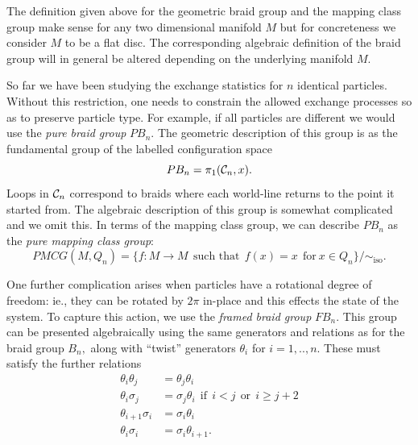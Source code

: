 
The definition given above for the geometric braid group
and the mapping class group make sense for any two dimensional
manifold $M$ but for concreteness we consider $M$ to be
a flat disc. 
The corresponding algebraic definition of the braid group
will in general be altered depending on the underlying manifold
$M.$

So far we have been studying the exchange statistics
for $n$ identical particles. Without this restriction, one needs to
constrain the allowed exchange processes so as to preserve particle type.
For example, if all particles are different we would use the
\emph{pure braid group} $PB_n.$
The geometric description of
this group is as the fundamental group of the labelled
configuration space
$$
    PB_n = \pi_1 ( \mathcal{C}_n, x ).
$$
Loops in $\mathcal{C}_n$ correspond to braids where each world-line returns
to the point it started from.
The algebraic description of this group is somewhat complicated and
we omit this.
In terms of the mapping class group, we can describe $PB_n$
as the \emph{pure mapping class group}:
$$
    PMCG(M, Q_n) = \{ f : M \to M \ \ \mbox{such that}\ \ f(x)=x \ \ \mbox{for}\ x\in Q_n\} / \sim_{\mbox{iso}}.
$$

One further complication arises when particles have a rotational
degree of freedom: ie., they can be rotated by $2\pi$ in-place and
this effects the state of the system.
To capture this action, we use the \emph{framed braid group} $FB_n.$
This group can be presented algebraically using the same generators
and relations as for the braid group $B_n,$ along with
``twist'' generators $\theta_i$ for $i=1,..,n.$
These must satisfy the further relations
\begin{align*}
    \theta_i \theta_j &= \theta_j \theta_i \\
    \theta_i\sigma_j &= \sigma_j\theta_i 
    \ \ \mbox{if}\ \ i<j \ \ \mbox{or}\ \ i\ge j+2\\
    \theta_{i+1}\sigma_i &= \sigma_i\theta_i \\
    \theta_{i}\sigma_i &= \sigma_i\theta_{i+1}.
\end{align*}

